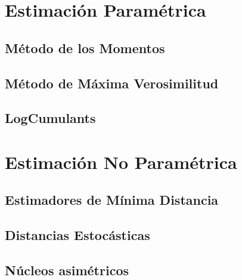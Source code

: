 \section{Estimación Paramétrica}
\subsection{Método de los Momentos}
\subsection{Método de Máxima Verosimilitud}
\subsection{LogCumulants}

\section{Estimación No Paramétrica}
\subsection{Estimadores de Mínima Distancia}
\subsection{Distancias Estocásticas}
\subsection{Núcleos asimétricos}

